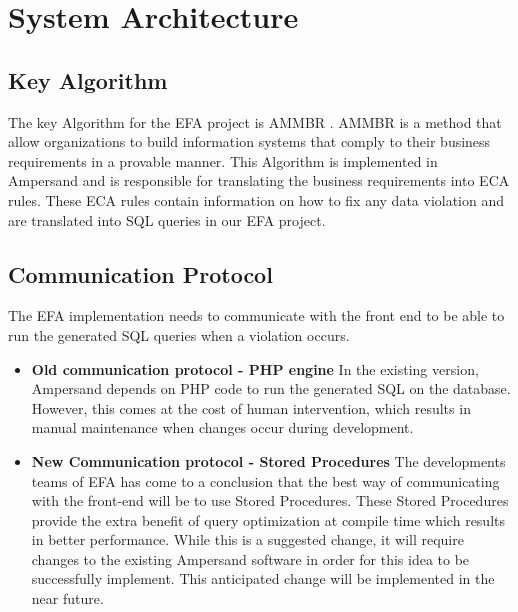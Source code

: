 \documentclass[12pt, svgnames]{article}
\begin{document}

\newpage
\section{System Architecture} \label{SystemArch}

\subsection{Key Algorithm}
The key Algorithm for the EFA project is AMMBR \cite{AMMBR}. AMMBR is a method 
that allow organizations to build information systems that comply to their 
business requirements in a provable manner. This Algorithm is implemented in 
Ampersand and is responsible for translating the business requirements into ECA 
rules. These ECA rules contain information on how to fix any data violation and 
are translated into SQL queries in our EFA project.

\subsection{Communication Protocol}
The EFA implementation needs to communicate with the front end to be able to 
run the generated SQL queries when a violation occurs. 
	\begin{itemize}
		\item \textbf{Old communication protocol -  PHP engine} \newline
			In the existing version, Ampersand depends on PHP code to run the 
			generated SQL on the database. However, this comes at the cost of 
			human intervention, which results in manual maintenance when 
			changes occur during development. 
		\item \textbf{New Communication protocol - Stored Procedures} \newline
			The developments teams of EFA has come to a conclusion that the 
			best way of communicating with the front-end will be to use Stored 
			Procedures\cite{SP}. These Stored Procedures provide the extra 
			benefit of query optimization at compile time which results in 
			better performance. While this is a suggested change, it will 
			require changes to the existing Ampersand software in order for 
			this idea to be successfully implement. This anticipated 
			change will be implemented in the near future.
			
	\end{itemize}
\end{document}
